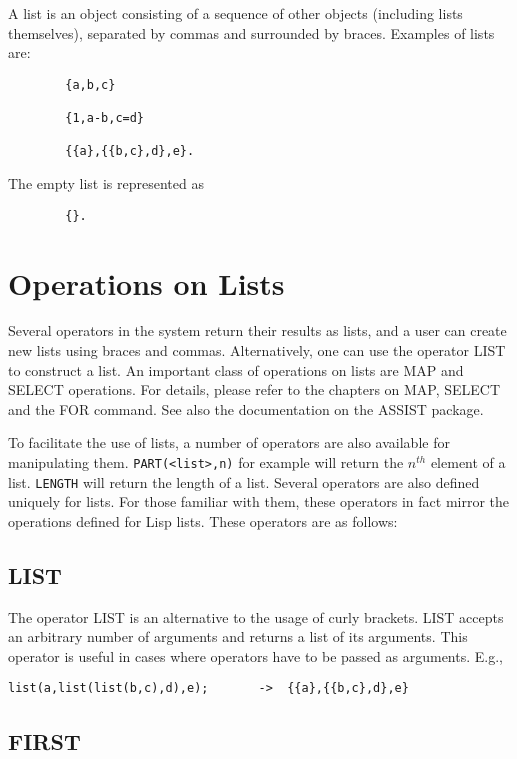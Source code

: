 \documentclass[11pt,letterpaper]{book}
\makeatletter
\newcommand{\underscore}{\_}
\newcommand{\ttindex}[1]{{\renewcommand{\_}{\protect\underscore}%
                          \index{#1@{\tt #1}}}}
\makeatother
\begin{document}
A list is an object consisting of a sequence of other objects
(including lists themselves), separated by commas and surrounded by
braces.  Examples of lists are:
{\small\begin{verbatim}
        {a,b,c}

        {1,a-b,c=d}

        {{a},{{b,c},d},e}.
\end{verbatim}}
The empty list is represented as
{\small\begin{verbatim}
        {}.
\end{verbatim}}

\section{Operations on Lists}

Several operators in the system return their results as lists, and a user
can create new lists using braces and commas.  Alternatively, one can use
the operator LIST to construct a list.  An important class of operations
on lists are MAP and SELECT operations.  For details, please refer to the
chapters on MAP, SELECT and the FOR command.  See also the documentation
on the ASSIST package.

To facilitate the use of
lists, a number of operators are also available for manipulating
them. {\tt PART(<list>,n)}\ttindex{PART} for example will return the
$n^{th}$ element of a list. {\tt LENGTH}\ttindex{LENGTH} will return the
length of a list.  Several operators are also defined uniquely for lists.
For those familiar with them, these operators in fact mirror the
operations defined for Lisp lists.  These operators are as follows:

\subsection{LIST}

The operator LIST is an alternative to the usage of curly brackets. LIST
accepts an arbitrary number of arguments and returns a list
of its arguments. This operator is useful in cases where operators
have to be passed as arguments. E.g.,
{\small\begin{verbatim}
list(a,list(list(b,c),d),e);       ->  {{a},{{b,c},d},e}
\end{verbatim}}

\subsection{FIRST}
\end{document}
